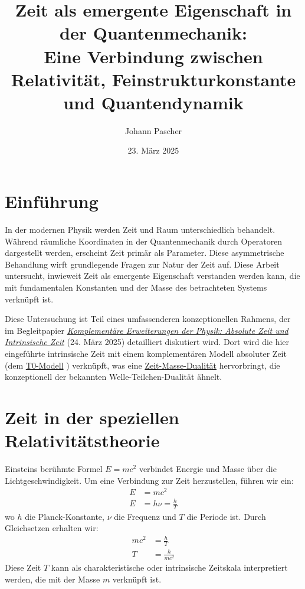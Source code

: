 \documentclass[12pt,a4paper]{article}
\title{Zeit als emergente Eigenschaft in der Quantenmechanik: \\Eine Verbindung zwischen Relativität, Feinstrukturkonstante und Quantendynamik}
\author{Johann Pascher}
\date{23. März 2025}
\begin{document}
	
	\maketitle
	
	\tableofcontents
	\newpage
	
	\section{Einführung}
	In der modernen Physik werden Zeit und Raum unterschiedlich behandelt. Während räumliche Koordinaten in der Quantenmechanik durch Operatoren dargestellt werden, erscheint Zeit primär als Parameter. Diese asymmetrische Behandlung wirft grundlegende Fragen zur Natur der Zeit auf. Diese Arbeit untersucht, inwieweit Zeit als emergente Eigenschaft verstanden werden kann, die mit fundamentalen Konstanten und der Masse des betrachteten Systems verknüpft ist.
	
	Diese Untersuchung ist Teil eines umfassenderen konzeptionellen Rahmens, der im Begleitpapier \href{https://github.com/jpascher/T0-Time-Mass-Duality/tree/main/2/pdf/Deutsch/Komplementäre\%20Erweiterungen\%20der\%20Physik\%20Absolute\%20Zeit\%20und\%20Intrinsische\%20Zeit.pdf}{\textit{Komplementäre Erweiterungen der Physik: Absolute Zeit und Intrinsische Zeit}} \cite{pascher1} (24. März 2025) detailliert diskutiert wird. Dort wird die hier eingeführte intrinsische Zeit mit einem komplementären Modell absoluter Zeit (dem \href{https://github.com/jpascher/T0-Time-Mass-Duality/tree/main/2/pdf/Deutsch/Zeit-Masse-Dualitätstheorie\%20(T0-Modell)\%20Herleitung\%20der\%20Parameter\%20kappa,\%20alpha\%20und\%20beta.pdf}{T0-Modell} \cite{pascher_params_2025}) verknüpft, was eine \href{https://github.com/jpascher/T0-Time-Mass-Duality/tree/main/2/pdf/Deutsch/Mathematische\%20Formulierungen\%20der\%20Zeit-Masse-Dualitätstheorie\%20mit\%20Lagrange.pdf}{Zeit-Masse-Dualität} \cite{pascher_lagrange_2025} hervorbringt, die konzeptionell der bekannten Welle-Teilchen-Dualität ähnelt.
	
	\section{Zeit in der speziellen Relativitätstheorie}
	Einsteins berühmte Formel \( E = mc^2 \) verbindet Energie und Masse über die Lichtgeschwindigkeit. Um eine Verbindung zur Zeit herzustellen, führen wir ein:
	\begin{align}
		E &= mc^2 \\
		E &= h\nu = \frac{h}{T}
	\end{align}
	wo \( h \) die Planck-Konstante, \( \nu \) die Frequenz und \( T \) die Periode ist. Durch Gleichsetzen erhalten wir:
	\begin{align}
		mc^2 &= \frac{h}{T} \\
		T &= \frac{h}{mc^2}
	\end{align}
	Diese Zeit \( T \) kann als charakteristische oder intrinsische Zeitskala interpretiert werden, die mit der Masse \( m \) verknüpft ist.
	
\end{document}
